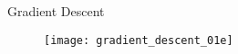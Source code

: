 











\begin{frame}{Gradient Descent}
  \begin{figure}
    \texttt{[image: gradient\_descent\_01e]}
  \end{figure}

\end{frame}


